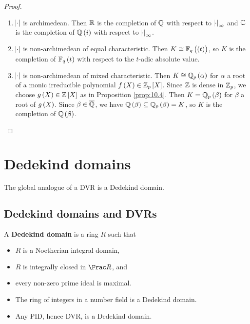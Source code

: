 \begin{proof}
\hfill
\begin{enumerate}[leftmargin=0.5in, label=Case \arabic*.]
\item $ \abs{\cdot} $ is archimedean. Then $ \mathbb{R} $ is the completion of $ \mathbb{Q} $ with respect to $ \abs{\cdot}_\infty $ and $ \mathbb{C} $ is the completion of $ \QQ\br{i} $ with respect to $ \abs{\cdot}_\infty $.
\item $ \abs{\cdot} $ is non-archimedean of equal characteristic. Then $ K \cong \FF_q\br{\br{t}} $, so $ K $ is the completion of $ \FF_q\br{t} $ with respect to the $ t $-adic absolute value.
\item $ \abs{\cdot} $ is non-archimedean of mixed characteristic. Then $ K \cong \QQ_p\br{\alpha} $ for $ \alpha $ a root of a monic irreducible polynomial $ f\br{X} \in \ZZ_p\sbr{X} $. Since $ \mathbb{Z} $ is dense in $ \mathbb{Z}_p $, we choose $ g\br{X} \in \ZZ\sbr{X} $ as in Proposition \ref{prop:10.4}. Then $ K = \QQ_p\br{\beta} $ for $ \beta $ a root of $ g\br{X} $. Since $ \beta \in \overline{\mathbb{Q}} $, we have $ \QQ\br{\beta} \subseteq \QQ_p\br{\beta} = K $, so $ K $ is the completion of $ \QQ\br{\beta} $.
\end{enumerate}
\end{proof}

\pagebreak

\section{Dedekind domains}

The global analogue of a DVR is a Dedekind domain.

\subsection{Dedekind domains and DVRs}

\begin{definition}
A \textbf{Dedekind domain} is a ring $ R $ such that
\begin{itemize}
\item $ R $ is a Noetherian integral domain,
\item $ R $ is integrally closed in $ \Frac R $, and
\item every non-zero prime ideal is maximal.
\end{itemize}
\end{definition}

\begin{example*}
\hfill
\begin{itemize}
\item The ring of integers in a number field is a Dedekind domain.
\item Any PID, hence DVR, is a Dedekind domain.
\end{itemize}
\end{example*}

